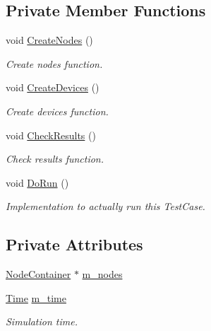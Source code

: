\subsection*{Private Member Functions}
\begin{DoxyCompactItemize}
\item 
void \hyperlink{classPeerManagementProtocolRegressionTest_ae99cd68cb2508b2ce4179d6b301be8c8}{Create\+Nodes} ()
\begin{DoxyCompactList}\small\item\em Create nodes function. \end{DoxyCompactList}\item 
void \hyperlink{classPeerManagementProtocolRegressionTest_a045b489f508afaecc5b5abb9d3513918}{Create\+Devices} ()
\begin{DoxyCompactList}\small\item\em Create devices function. \end{DoxyCompactList}\item 
void \hyperlink{classPeerManagementProtocolRegressionTest_acdc7d080797eb9bb9a6da6bc0656031b}{Check\+Results} ()
\begin{DoxyCompactList}\small\item\em Check results function. \end{DoxyCompactList}\item 
void \hyperlink{classPeerManagementProtocolRegressionTest_aff79851d62fd61dfc7f225565465b0b4}{Do\+Run} ()
\begin{DoxyCompactList}\small\item\em Implementation to actually run this Test\+Case. \end{DoxyCompactList}\end{DoxyCompactItemize}
\subsection*{Private Attributes}
\begin{DoxyCompactItemize}
\item 
\hyperlink{classns3_1_1NodeContainer}{Node\+Container} $\ast$ \hyperlink{classPeerManagementProtocolRegressionTest_ac19c6874aa4fd4a8d22ee2df374a619c}{m\+\_\+nodes}
\item 
\hyperlink{classns3_1_1Time}{Time} \hyperlink{classPeerManagementProtocolRegressionTest_a586c55d82b9d8c37fb75b8622ad99faa}{m\+\_\+time}
\begin{DoxyCompactList}\small\item\em Simulation time. \end{DoxyCompactList}\end{DoxyCompactItemize}
